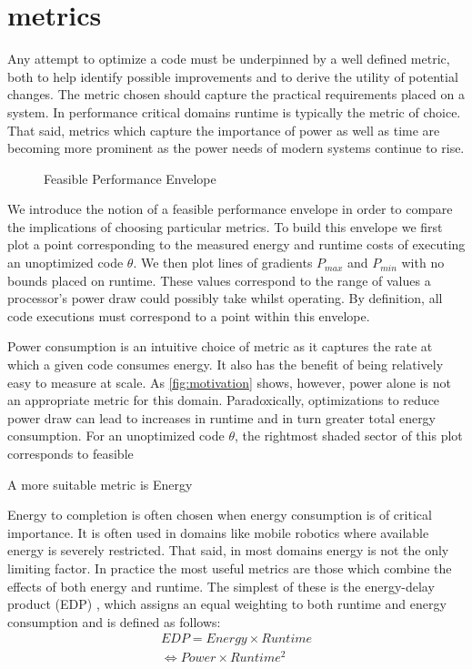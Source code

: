 \section{metrics}

Any attempt to optimize a code must be underpinned by a well defined metric, both to help identify possible improvements and to derive the utility of potential changes. The metric chosen should capture the practical requirements placed on a system. In performance critical domains runtime is typically the metric of choice. That said, metrics which capture the importance of power as well as time are becoming more prominent as the power needs of modern systems continue to rise.

\begin{figure}
\centering

\caption{Feasible Performance Envelope}
\label{fig:motivation}
\end{figure}

We introduce the notion of a feasible performance envelope in order to compare  the implications of choosing particular metrics.
To build this envelope we first plot a point corresponding to the measured energy and runtime costs of executing an unoptimized code $\theta$. We then plot lines of gradients $P_{max}$ and $P_{min}$ with no bounds placed on runtime. These values correspond to the range of values a processor's power draw could possibly take whilst operating. By definition, all code executions must correspond to a point within this envelope.

Power consumption is an intuitive choice of metric as it captures the rate at which a given code consumes energy. It also has the benefit of being relatively easy to measure at scale. As \autoref{fig:motivation} shows, however, power alone is not an appropriate metric for this domain. Paradoxically, optimizations to reduce power draw can lead to increases in runtime and in turn greater total energy consumption. For an unoptimized code $\theta$, the rightmost shaded sector of this plot corresponds to feasible  



A more suitable metric is Energy 




Energy to completion is often chosen when energy consumption is of critical importance. It is often used in domains like mobile robotics where available energy is severely restricted. That said, in most domains energy is not the only limiting factor. In practice the most useful metrics are those which combine the effects of both energy and runtime. The simplest of these is the energy-delay product (EDP) \cite{gonzales:1995aa}, which assigns an equal weighting to both runtime and energy consumption and is defined as follows:
\begin{align}
  EDP = Energy \times Runtime \nonumber \\
      \Leftrightarrow Power \times Runtime^{2} 
  \label{eq:edp}
\end{align}

